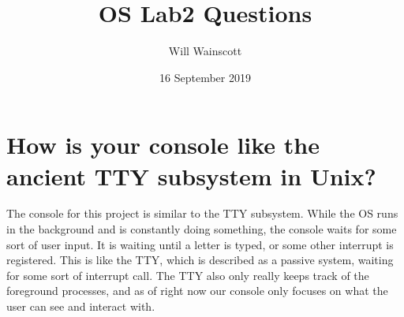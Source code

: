 \documentclass{article}
\title{OS Lab2 Questions}
\author{Will Wainscott}
\date{16 September 2019}
\begin{document}
\maketitle

\section{How is your console like the ancient TTY subsystem in Unix?}

The console for this project is similar to the TTY subsystem. While the OS runs in the background and is constantly doing something, the console waits for some sort of user input. It is waiting until a letter is typed, or some other interrupt is registered. This is like the TTY, which is described as a passive system, waiting for some sort of interrupt call. The TTY also only really keeps track of the foreground processes, and as of right now our console only focuses on what the user can see and interact with.
\end{document}
